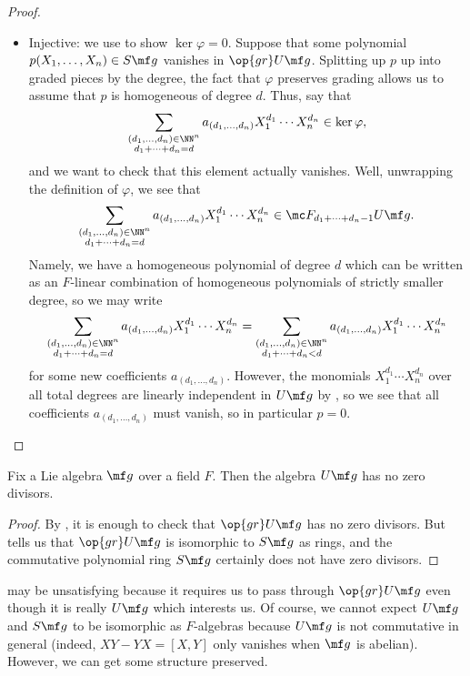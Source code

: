 \documentclass[../notes.tex]{subfiles}
\begin{document}
\begin{proof}
\begin{itemize}
		\item Injective: we use  to show $\ker\varphi=0$. Suppose that some polynomial $p(X_1,\ldots,X_n)\in S\mf g$ vanishes in $\op{gr}U\mf g$. Splitting up $p$ up into graded pieces by the degree, the fact that $\varphi$ preserves grading allows us to assume that $p$ is homogeneous of degree $d$. Thus, say that
		\[\sum_{\substack{(d_1,\ldots,d_n)\in\NN^n\\d_1+\cdots+d_n=d}}a_{(d_1,\ldots,d_n)}X_1^{d_1}\cdots X_n^{d_n}\in\ker\varphi,\]
		and we want to check that this element actually vanishes. Well, unwrapping the definition of $\varphi$, we see that
		\[\sum_{\substack{(d_1,\ldots,d_n)\in\NN^n\\d_1+\cdots+d_n=d}}a_{(d_1,\ldots,d_n)}X_1^{d_1}\cdots X_n^{d_n}\in\mc F_{d_1+\cdots+d_n-1}U\mf g.\]
		Namely, we have a homogeneous polynomial of degree $d$ which can be written as an $F$-linear combination of homogeneous polynomials of strictly smaller degree, so we may write
		\[\sum_{\substack{(d_1,\ldots,d_n)\in\NN^n\\d_1+\cdots+d_n=d}}a_{(d_1,\ldots,d_n)}X_1^{d_1}\cdots X_n^{d_n}=\sum_{\substack{(d_1,\ldots,d_n)\in\NN^n\\d_1+\cdots+d_n<d}}a_{(d_1,\ldots,d_n)}X_1^{d_1}\cdots X_n^{d_n}\]
		for some new coefficients $a_{(d_1,\ldots,d_n)}$. However, the monomials $X_1^{d_1}\cdots X_n^{d_n}$ over all total degrees are linearly independent in $U\mf g$ by , so we see that all coefficients $a_{(d_1,\ldots,d_n)}$ must vanish, so in particular $p=0$.
		\qedhere
	\end{itemize}
\end{proof}
\begin{corollary}
	Fix a Lie algebra $\mf g$ over a field $F$. Then the algebra $U\mf g$ has no zero divisors.
\end{corollary}
\begin{proof}
	By , it is enough to check that $\op{gr}U\mf g$ has no zero divisors. But  tells us that $\op{gr}U\mf g$ is isomorphic to $S\mf g$ as rings, and the commutative polynomial ring $S\mf g$ certainly does not have zero divisors.
\end{proof}
 may be unsatisfying because it requires us to pass through $\op{gr}U\mf g$ even though it is really $U\mf g$ which interests us. Of course, we cannot expect $U\mf g$ and $S\mf g$ to be isomorphic as $F$-algebras because $U\mf g$ is not commutative in general (indeed, $XY-YX=[X,Y]$ only vanishes when $\mf g$ is abelian). However, we can get some structure preserved.
\end{document}

